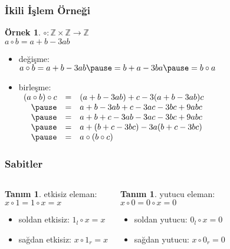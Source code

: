 \documentclass[dvipsnames]{beamer}
\theoremstyle{definition}
\newtheorem{tanim}[theorem]{Tanım}
\theoremstyle{example}
\newtheorem{ornek}[theorem]{Örnek}
\theoremstyle{plain}
\begin{document}
\begin{frame}
  \frametitle{İkili İşlem Örneği}

  \begin{ornek}
    $\circ: \mathbb{Z} \times \mathbb{Z} \rightarrow \mathbb{Z}$\\
    $a \circ b = a + b - 3ab$

    \pause
    \medskip
    \begin{itemize}
      \item değişme:\\
        $a \circ b = a + b - 3ab \pause
                   = b + a - 3ba \pause
                   = b \circ a$

      \pause
      \medskip
      \item birleşme:\\
        $\begin{array}{rcl}
          (a \circ b) \circ c & = & (a + b - 3ab) + c - 3 (a + b - 3ab) c\\ \pause
                              & = & a + b - 3ab + c - 3ac - 3bc + 9abc\\ \pause
                              & = & a + b + c - 3ab - 3ac - 3bc + 9abc\\ \pause
                              & = & a + (b + c - 3bc) - 3 a (b + c - 3bc)\\ \pause
                              & = & a \circ (b \circ c)
        \end{array}$
     \end{itemize}
 \end{ornek}
\end{frame}

\begin{frame}
  \frametitle{Sabitler}

  \begin{columns}
    \begin{tanim}
      \alert{etkisiz eleman}:\\
      $x \circ 1 = 1 \circ x = x$

      \pause
      \begin{itemize}
        \item soldan etkisiz: $1_l \circ x = x$
        \item sağdan etkisiz: $x \circ 1_r = x$
      \end{itemize}
    \end{tanim}

    \pause
    \begin{tanim}
      \alert{yutucu eleman}:\\
      $x \circ 0 = 0 \circ x = 0$

      \pause
      \begin{itemize}
        \item soldan yutucu: $0_l \circ x = 0$
        \item sağdan yutucu: $x \circ 0_r = 0$
      \end{itemize}
    \end{tanim}
  \end{columns}
\end{frame}
\end{document}

